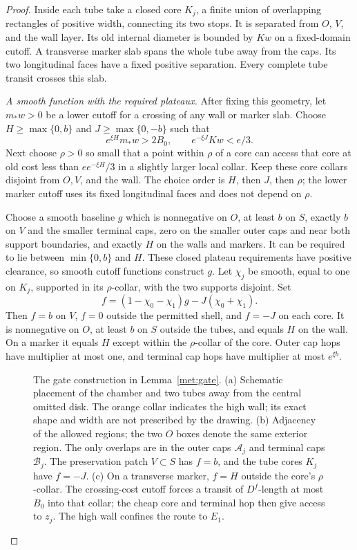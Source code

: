 \begin{proof}
Inside each tube take a closed core $K_j$, a finite union of
overlapping rectangles of positive width, connecting its two stops.
It is separated from $O$, $V$, and the wall layer.  Its old internal
diameter is bounded by $Kw$ on a fixed-domain cutoff.  A transverse
marker slab spans the whole tube away from the caps.  Its two
longitudinal faces have a fixed positive separation.  Every complete
tube transit crosses this slab.

\emph{A smooth function with the required plateaux.}
After fixing this geometry, let $m_*w>0$ be a lower cutoff for a
crossing of any wall or marker slab.  Choose $H\geq\max\{0,b\}$ and
$J\geq\max\{0,-b\}$ such that
\[
 e^{\xi H}m_*w>2B_0,
 \qquad e^{-\xi J}Kw<e/3.
\]
Next choose $\rho>0$ so small that a point within $\rho$ of a core
can access that core at old cost less than $e e^{-\xi H}/3$ in a
slightly larger local collar.  Keep these core collars disjoint from
$O,V$, and the wall.  The choice order is $H$, then $J$, then
$\rho$; the lower marker cutoff uses its fixed longitudinal faces
and does not depend on $\rho$.

Choose a smooth baseline $g$ which is nonnegative on $O$, at least
$b$ on $S$, exactly $b$ on $V$ and the smaller terminal caps, zero
on the smaller outer caps and near both support boundaries, and
exactly $H$ on the walls and markers.  It can be required to lie
between $\min\{0,b\}$ and $H$.  These closed plateau requirements
have positive clearance, so smooth cutoff functions construct $g$.
Let $\chi_j$ be smooth, equal to one on $K_j$, supported in its
$\rho$-collar, with the two supports disjoint.  Set
\begin{equation}
 f=(1-\chi_0-\chi_1)g-J(\chi_0+\chi_1).
 \label{met:gate-function}
\end{equation}
Then $f=b$ on $V$, $f=0$ outside the permitted shell, and $f=-J$
on each core.  It is nonnegative on $O$, at least $b$ on $S$ outside
the tubes, and equals $H$ on the wall.  On a marker it equals $H$
except within the $\rho$-collar of the core.  Outer cap hops have
multiplier at most one, and terminal cap hops have multiplier at
most $e^{\xi b}$.

\begin{figure}[htbp]
\centering

\caption{The gate construction in Lemma~\ref{met:gate}.
(a) Schematic placement of the chamber and two tubes away from the
central omitted disk.  The orange collar indicates the high wall;
its exact shape and width are not prescribed by the drawing.
(b) Adjacency of the allowed regions; the two $O$ boxes denote the same
exterior region.  The only overlaps are in the outer caps $\mathcal A_j$
and terminal caps $\mathcal B_j$.  The preservation patch $V\subset S$
has $f=b$, and the tube cores $K_j$ have $f=-J$.
(c) On a transverse marker, $f=H$ outside the core's $\rho$-collar.
The crossing-cost cutoff forces a transit of $D^f$-length at most $B_0$
into that collar; the cheap core and terminal hop then give access to
$z_j$.  The high wall confines the route to $E_1$.}
\label{met:gate-figure}
\end{figure}


\end{proof}
